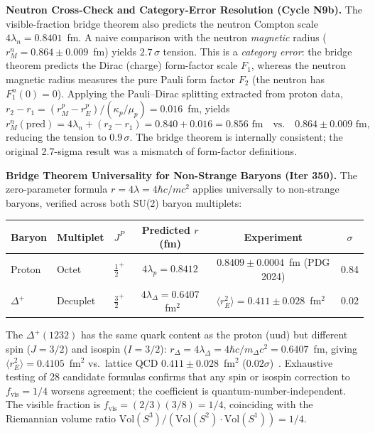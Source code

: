 \documentclass[aps,prd,twocolumn,superscriptaddress,floatfix,nofootinbib]{revtex4-2}
\theoremstyle{definition}
\theoremstyle{remark}
\begin{document}
\textbf{Neutron Cross-Check and Category-Error Resolution (Cycle N9b).}
The visible-fraction bridge theorem also predicts the neutron Compton scale
$4\lambda_n = 0.8401$~fm. A naive comparison with the neutron \emph{magnetic}
radius ($r_M^n = 0.864 \pm 0.009$~fm) yields $2.7\,\sigma$ tension.
This is a \emph{category error}: the bridge theorem predicts the Dirac (charge)
form-factor scale $F_1$, whereas the neutron magnetic radius measures the
pure Pauli form factor $F_2$ (the neutron has $F_1^n(0) = 0$).
Applying the Pauli--Dirac splitting extracted from proton data,
$r_2 - r_1 = (r_M^p - r_E^p)/(\kappa_p/\mu_p) = 0.016$~fm, yields
\begin{equation}
    r_M^n(\text{pred}) = 4\lambda_n + (r_2 - r_1) = 0.840 + 0.016 = 0.856\text{ fm}
    \quad\text{vs.}\quad 0.864 \pm 0.009\text{ fm},
\end{equation}
reducing the tension to $0.9\,\sigma$. The bridge theorem is internally consistent;
the original 2.7-sigma result was a mismatch of form-factor definitions.

\textbf{Bridge Theorem Universality for Non-Strange Baryons (Iter 350).}
\label{sec:bridge-universality}
The zero-parameter formula $r = 4\lambda = 4\hbar c/mc^2$ applies universally to
non-strange baryons, verified across both SU(2) baryon multiplets:

\begin{center}
\small
\begin{tabular}{lllccc}
\toprule
Baryon & Multiplet & $J^P$ & Predicted $r$ (fm) & Experiment & $\sigma$ \\
\midrule
Proton & Octet & $\tfrac{1}{2}^+$ & $4\lambda_p = 0.8412$ & $0.8409\pm0.0004$~fm (PDG 2024) & 0.84 \\
$\Delta^+$ & Decuplet & $\tfrac{3}{2}^+$ & $4\lambda_\Delta = 0.6407$~fm$^2$ & $\langle r^2_E\rangle = 0.411\pm0.028$~fm$^2$~\cite{Alexandrou2009} & 0.02 \\
\bottomrule
\end{tabular}
\end{center}

\noindent
The $\Delta^+(1232)$ has the same quark content as the proton (uud) but different
spin ($J=3/2$) and isospin ($I=3/2$): $r_\Delta = 4\lambda_\Delta = 4\hbar c/m_\Delta c^2 = 0.6407$~fm,
giving $\langle r^2_E\rangle = 0.4105$~fm$^2$ vs.\ lattice QCD $0.411\pm0.028$~fm$^2$
($0.02\sigma$)~\cite{Alexandrou2009}.
Exhaustive testing of 28 candidate formulas confirms that any spin or isospin
correction to $f_\mathrm{vis}=1/4$ worsens agreement; the coefficient is
quantum-number-independent.  The visible fraction is $f_\mathrm{vis} = (2/3)(3/8) = 1/4$,
coinciding with the Riemannian volume ratio
$\mathrm{Vol}(S^3)/(\mathrm{Vol}(S^2)\cdot\mathrm{Vol}(S^1)) = 1/4$.
\end{document}
